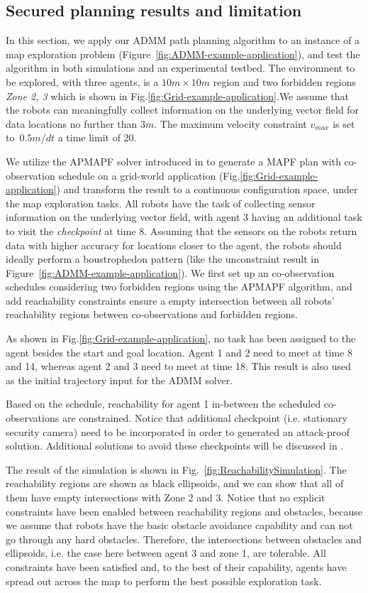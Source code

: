 \documentclass[journal]{IEEEtran}  %
\begin{document}
\subsection{Secured planning results and limitation}
In this section, we apply our ADMM path planning algorithm to an instance of a map exploration problem (Figure~\ref{fig:ADMM-example-application}), and test the algorithm in both simulations and an experimental testbed. The environment to be explored, with three agents, is a $10m\times10m$ region and two forbidden regions \emph{Zone 2, 3} which is shown in Fig.\ref{fig:Grid-example-application}.We assume that the robots can meaningfully collect information on the underlying vector field for data locations no further than $3m$. The maximum velocity constraint $v_{max}$ is set to~$0.5m/dt$ a time limit of 20. 

We utilize the APMAPF solver introduced in \cite{wardega2019resilience} to generate a MAPF plan with co-observation schedule on a grid-world application (Fig.\ref{fig:Grid-example-application}) and transform the result to a continuous configuration space, under the map exploration tasks.  All robots have the task of collecting sensor information on the underlying vector field, with agent 3 having an additional task to visit the \emph{checkpoint} at time $8$. Assuming that the sensors on the robots return data with higher accuracy for locations closer to the agent, the robots should ideally perform a boustrophedon pattern (like the unconstraint result in Figure~\ref{fig:ADMM-example-application}). We first set up an co-observation schedules considering two forbidden regions using the APMAPF algorithm, and add reachability constraints ensure a empty intersection between all robots' reachability regions between co-observations and forbidden regions.

As shown in Fig.\ref{fig:Grid-example-application}, no task has been assigned to the agent besides the start and goal location. Agent 1 and 2 need to meet at time 8 and 14, whereas agent 2 and 3 need to meet at time 18. This result is also used as the initial trajectory input for the ADMM solver. 

Based on the schedule, reachability for agent 1 in-between the scheduled co-observations are constrained. Notice that additional checkpoint (i.e. stationary security camera) need to be incorporated in order to generated an attack-proof solution. Additional solutions to avoid these checkpoints will be discussed in .  

The result of the simulation is shown in Fig.~\ref{fig:ReachabilitySimulation}. The reachability regions are shown as black ellipsoids, and we can show that all of them have empty intersections with Zone 2 and 3. Notice that no explicit constraints have been enabled between reachability regions and obstacles, because we assume that robots have the basic obstacle avoidance capability and can not go through any hard obstacles. Therefore, the intersections between obstacles and ellipsoids, i.e. the case here between agent 3 and zone 1, are tolerable. All constraints have been satisfied and, to the best of their capability, agents have spread out across the map to perform the best possible exploration task. 
\end{document}
